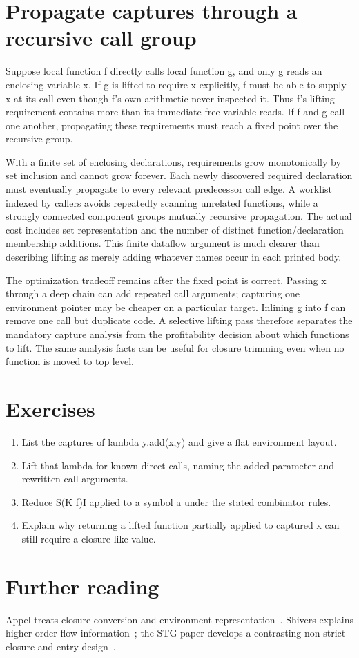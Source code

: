 \section{Propagate captures through a recursive call group}
\label{sec:ch91-transitive}
Suppose local function f directly calls local function g, and only g reads an enclosing variable x.
If g is lifted to require x explicitly, f must be able to supply x at its call even though f's own arithmetic never inspected it.
Thus f's lifting requirement contains more than its immediate free-variable reads.
If f and g call one another, propagating these requirements must reach a fixed point over the recursive group.

With a finite set of enclosing declarations, requirements grow monotonically by set inclusion and cannot grow forever.
Each newly discovered required declaration must eventually propagate to every relevant predecessor call edge.
A worklist indexed by callers avoids repeatedly scanning unrelated functions, while a strongly connected component groups mutually recursive propagation.
The actual cost includes set representation and the number of distinct function/declaration membership additions.
This finite dataflow argument is much clearer than describing lifting as merely adding whatever names occur in each printed body.

The optimization tradeoff remains after the fixed point is correct.
Passing x through a deep chain can add repeated call arguments; capturing one environment pointer may be cheaper on a particular target.
Inlining g into f can remove one call but duplicate code.
A selective lifting pass therefore separates the mandatory capture analysis from the profitability decision about which functions to lift.
The same analysis facts can be useful for closure trimming even when no function is moved to top level.

\section{Exercises}
\label{sec:ch91-exercises}
\begin{enumerate}
\item\label{ex:ch91-captures} List the captures of lambda y.add(x,y) and give a flat environment layout.
\item\label{ex:ch91-lift} Lift that lambda for known direct calls, naming the added parameter and rewritten call arguments.
\item\label{ex:ch91-comb} Reduce S(K f)I applied to a symbol a under the stated combinator rules.
\item\label{ex:ch91-escape} Explain why returning a lifted function partially applied to captured x can still require a closure-like value.
\end{enumerate}

\section{Further reading}
\label{sec:ch91-reading}
Appel treats closure conversion and environment representation~\cite{appel-1998-modern}.
Shivers explains higher-order flow information~\cite{shivers-1991-control}; the STG paper develops a contrasting non-strict closure and entry design~\cite{peytonjones-1992-stg}.
